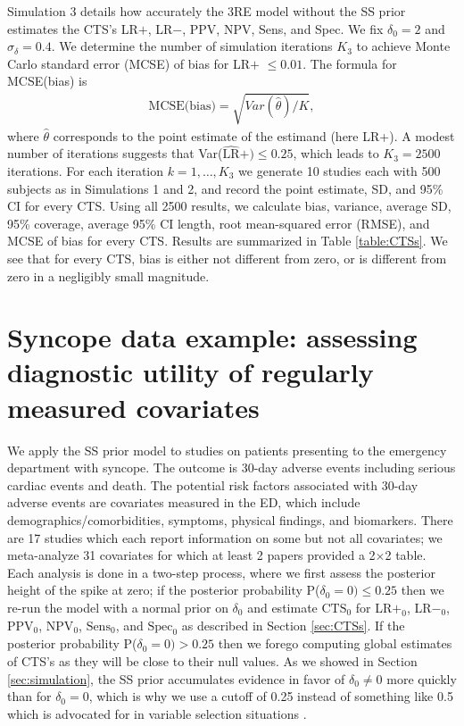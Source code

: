 \documentclass[AMA,STIX1COL]{WileyNJD-v2}
\begin{document}
Simulation 3 details how accurately the 3RE model without the SS prior estimates the CTS's LR$+$, LR$-$, PPV, NPV, Sens, and Spec. We fix $\delta_0 = 2$ and $\sigma_\delta = 0.4$. We determine the number of simulation iterations $K_3$ to achieve Monte Carlo standard error (MCSE) of bias for LR$+$ $\le 0.01$. The formula for MCSE(bias) is 
\begin{align}
\mbox{MCSE(bias)} = \sqrt{Var(\hat{\theta}) / K}, \nonumber 
\end{align} 
\noindent where $\hat{\theta}$ corresponds to the point estimate of the estimand (here LR+). A modest number of iterations suggests that Var($\widehat{\mbox{LR}}+) \le 0.25$, which leads to $K_3 = 2500$ iterations. For each iteration $k = 1, \dots, K_3$ we generate 10 studies each with 500 subjects as in Simulations 1 and 2, and record the point estimate, SD, and 95\% CI for every CTS. Using all 2500 results, we calculate bias, variance, average SD, 95\% coverage, average 95\% CI length, root mean-squared error (RMSE), and MCSE of bias for every CTS. Results are summarized in Table \ref{table:CTSs}. We see that for every CTS, bias is either not different from zero, or is different from zero in a negligibly small magnitude. 

\section{Syncope data example: assessing diagnostic utility of regularly measured covariates} \label{sec:syncope}

We apply the SS prior model to studies on patients presenting to the emergency department with syncope. The outcome is 30-day adverse events including serious cardiac events and death. The potential risk factors associated with 30-day adverse events are covariates measured in the ED, which include demographics/comorbidities, symptoms, physical findings, and biomarkers. There are 17 studies which each report information on some but not all covariates; we meta-analyze 31 covariates for which at least 2 papers provided a 2$\times$2 table. Each analysis is done in a two-step process, where we first assess the posterior height of the spike at zero; if the posterior probability P($\delta_0 = 0) \le 0.25$ then we re-run the model with a normal prior on $\delta_0$ and estimate $\mbox{CTS}_0$ for LR$+_0$, LR$-_0$, $\mbox{PPV}_0$, $\mbox{NPV}_0$, $\mbox{Sens}_0$, and $\mbox{Spec}_0$ as described in Section \ref{sec:CTSs}. If the posterior probability P($\delta_0 = 0) > 0.25$ then we forego computing global estimates of CTS's as they will be close to their null values. As we showed in Section \ref{sec:simulation}, the SS prior accumulates evidence in favor of $\delta_0 \ne 0$ more quickly than for $\delta_0 = 0$, which is why we use a cutoff of 0.25 instead of something like 0.5 which is advocated for in variable selection situations \cite{barbieri2004}. 
\end{document}
